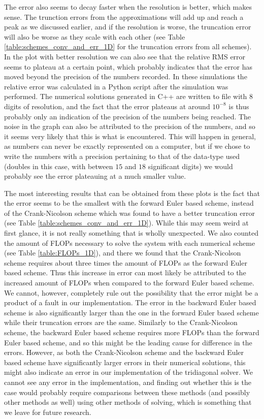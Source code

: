 \documentclass[reprint,english,notitlepage]{revtex4-1}  %
\begin{document}
The error also seems to decay faster when the resolution is better, which makes sense. The trunction errors from the approximations will add up and reach a peak as we discussed earlier, and if the resolution is worse, the truncation error will also be worse as they scale with each other (see Table \ref{table:schemes_conv_and_err_1D} for the truncation errors from all schemes). In the plot with better resolution we can also see that the relative RMS error seems to plateau at a certain point, which probably indicates that the error has moved beyond the precision of the numbers recorded. In these simulations the relative error was calculated in a Python script after the simulation was performed. The numerical solutions generated in C++ are written to file with 8 digits of resolution, and the fact that the error plateaus at around $10^{-8}$ is thus probably only an indication of the precision of the numbers being reached. The noise in the graph can also be attributed to the precision of the numbers, and so it seems very likely that this is what is encountered. This will happen in general, as numbers can never be exactly represented on a computer, but if we chose to write the numbers with a precision pertaining to that of the data-type used (doubles in this case, with between $15$ and $18$ significant digits) we would probably see the error plateauing at a much smaller value. 

The most interesting results that can be obtained from these plots is the fact that the error seems to be the smallest with the forward Euler based scheme, instead of the Crank-Nicolson scheme which was found to have a better truncation error (see Table \ref{table:schemes_conv_and_err_1D}). While this may seem weird at first glance, it is not really something that is wholly unexpected. We also counted the amount of FLOPs necessary to solve the system with each numerical scheme (see Table \ref{table:FLOPs_1D}), and there we found that the Crank-Nicolson scheme requires about three times the amount of FLOPs as the forward Euler based scheme. Thus this increase in error can most likely be attributed to the increased amount of FLOPs when compared to the forward Euler based scheme. We cannot, however, completely rule out the possibility that the error might be a product of a fault in our implementation. The error in the backward Euler based scheme is also significantly larger than the one in the forward Euler based scheme while their truncation errors are the same. Similarly to the Crank-Nicolson scheme, the backward Euler based scheme requires more FLOPs than the forward Euler based scheme, and so this might be the leading cause for difference in the errors. However, as both the Crank-Nicolson scheme and the backward Euler based scheme have significantly larger errors in their numerical solutions, this might also indicate an error in our implementation of the tridiagonal solver. We cannot see any error in the implementation, and finding out whether this is the case would probably require comparisons between these methods (and possibly other methods as well) using other methods of solving, which is something that we leave for future research.
\end{document}

